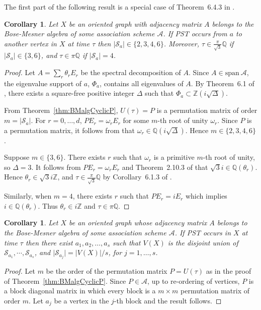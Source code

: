 \documentclass{amsart}
\theoremstyle{plain}
\newtheorem{cor}[theorem]{Corollary}
\theoremstyle{remark}\newtheorem{con}[theorem]{Construction}
\theoremstyle{remark} \newtheorem*{remark}{Remark}
\theoremstyle{remark} \newtheorem{example}{Example}
\newcommand{\bb}{\mathbb}
\newcommand{\cS}{\mathcal{S}}
\newcommand{\cA}{\mathcal{A}}
\newcommand{\BM}{\mathrm{span}\ \mathcal{A}}
\begin{document}
The first part of the following result is a special case of Theorem~6.4.3 in \cite{lato2019quantum}.

\begin{cor}\label{cor:BMalgSize}
    Let $X$ be an oriented graph with adjacency matrix $A$ belongs to the Bose-Mesner algebra of some association scheme $\cA$.
    If PST occurs from $a$ to another vertex in $X$ at time $\tau$ then $\vert \cS_a\vert \in\{2,3,4,6\}$.
    {Moreover, $\tau \in \frac{\pi}{\sqrt{3}} \bb{Q}$ if $\vert \cS_a\vert \in \{3,6\}$, and $\tau \in \pi \bb{Q}$ if $\vert \cS_a\vert =4$.}
\end{cor}
\begin{proof}
Let $A=\sum_{r} \theta_r E_r$ be the spectral decomposition of $A$.  
Since $A\in \BM$, the eigenvalue support of $a$, $\Phi_a$, contains all eigenvalues of $A$.
By Theorem~6.1 of \cite{godsil2020perfect}, there exists a square-free positive integer $\Delta$ such that $\Phi_a \subset {\bb{Z}}(i\sqrt{\Delta})$.

From Theorem~\ref{thm:BMalgCyclicP}, $U(\tau)=P$ is a permutation matrix of order $m=\vert \cS_a\vert$.  For $r=0,\ldots,d$, $ PE_r = \omega_r E_r$ for some $m$-th root of unity $\omega_r$.  Since $P$ is a permutation matrix, it follows from \cite[Lemma~2.10.3]{lato2019quantum}  that $\omega_r \in \bb{Q}(i\sqrt{\Delta})$.  Hence $m \in \{2,3,4,6\}$.

{
Suppose $m\in \{3, 6\}$.  There exists $r$ such that $\omega_r$ is a primitive $m$-th root of unity, so $\Delta=3$.
It follows from $PE_r = \omega_rE_r$ and Theorem~2.10.3 of \cite{lato2019quantum} that $\sqrt{3}i \in \bb{Q}(\theta_r)$.  Hence $\theta_r \in \sqrt{3}i \bb{Z}$, and $\tau \in \frac{\pi}{\sqrt{3}} \bb{Q}$
by Corollary~6.1.3 of \cite{lato2019quantum}.

Similarly, when $m=4$, there exists $r$ such that $PE_r = i E_r$ which implies $i\in \bb{Q}(\theta_r)$.
Thus $\theta_r \in i\bb{Z}$ and $\tau \in \pi\bb{Q}$.
}
\end{proof}


\begin{cor}
    Let $X$ be an oriented graph whose adjacency matrix $A$ belongs to the Bose-Mesner algebra of some association scheme $\cA$.
    If PST occurs in $X$ at time $\tau$ then there exist $a_1, a_2, \ldots, a_s$ such that $V(X)$ is the disjoint union of $\cS_{a_1},\cdots, \cS_{a_s}$, and $\vert \cS_{a_j} \vert = \vert V(X)\vert /s$, for $j=1,\ldots,s$.
\end{cor}
\begin{proof}
    Let $m$ be the order of the permutation matrix $P=U(\tau)$ as in the proof of Theorem~\ref{thm:BMalgCyclicP}.  Since $P \in \cA$, up to re-ordering of vertices, $P$ is a block diagonal matrix in which every block is a $m\times m$ permutation matrix of order $m$.   Let $a_j$ be a vertex in the $j$-th block and the result follows.
\end{proof}
\end{document}
